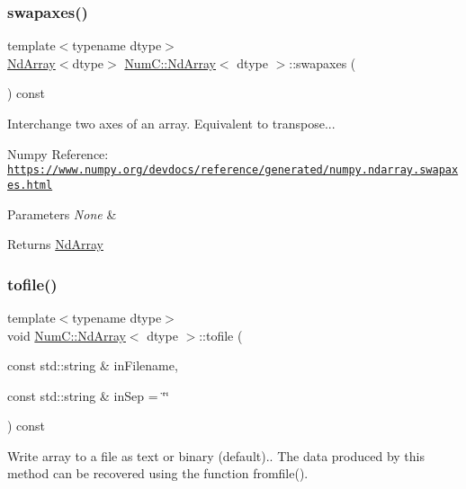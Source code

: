 \subsubsection{\texorpdfstring{swapaxes()}{swapaxes()}}
{\footnotesize\ttfamily template$<$typename dtype$>$ \\
\mbox{\hyperlink{class_num_c_1_1_nd_array}{Nd\+Array}}$<$dtype$>$ \mbox{\hyperlink{class_num_c_1_1_nd_array}{Num\+C\+::\+Nd\+Array}}$<$ dtype $>$\+::swapaxes (\begin{DoxyParamCaption}{ }\end{DoxyParamCaption}) const\hspace{0.3cm}{\ttfamily [inline]}}

Interchange two axes of an array. Equivalent to transpose...

Numpy Reference\+: \href{https://www.numpy.org/devdocs/reference/generated/numpy.ndarray.swapaxes.html}{\tt https\+://www.\+numpy.\+org/devdocs/reference/generated/numpy.\+ndarray.\+swapaxes.\+html}


\begin{DoxyParams}{Parameters}
{\em None} & \\
\hline
\end{DoxyParams}
\begin{DoxyReturn}{Returns}
\mbox{\hyperlink{class_num_c_1_1_nd_array}{Nd\+Array}} 
\end{DoxyReturn}
\mbox{\label{class_num_c_1_1_nd_array_a54684e5ea7f13318a45e06002bb8ca26}} 
\subsubsection{\texorpdfstring{tofile()}{tofile()}}
{\footnotesize\ttfamily template$<$typename dtype$>$ \\
void \mbox{\hyperlink{class_num_c_1_1_nd_array}{Num\+C\+::\+Nd\+Array}}$<$ dtype $>$\+::tofile (\begin{DoxyParamCaption}\item[{const std\+::string \&}]{in\+Filename,  }\item[{const std\+::string \&}]{in\+Sep = {\ttfamily \char`\"{}\char`\"{}} }\end{DoxyParamCaption}) const\hspace{0.3cm}{\ttfamily [inline]}}

Write array to a file as text or binary (default).. The data produced by this method can be recovered using the function fromfile().

